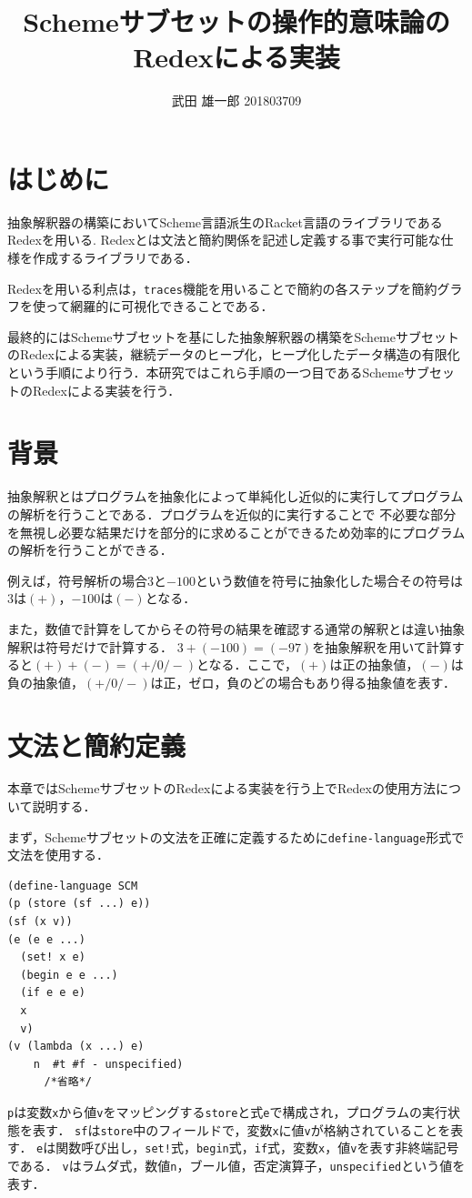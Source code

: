 \documentclass[twocolumn]{jsarticle}
\title{\textbf{Schemeサブセットの操作的意味論のRedexによる実装}}
\author{武田 雄一郎 201803709}
\date{} %
\begin{document}
\maketitle
\thispagestyle{fancy}

\section{はじめに}


抽象解釈器の構築においてScheme言語派生のRacket言語のライブラリであるRedexを用いる.
Redexとは文法と簡約関係を記述し定義する事で実行可能な仕様を作成するライブラリである．

Redexを用いる利点は，\verb|traces|機能を用いることで簡約の各ステップを簡約グラフを使って網羅的に可視化できることである．

最終的にはSchemeサブセット\cite{3}を基にした抽象解釈器の構築をSchemeサブセットのRedexによる実装，継続データのヒープ化\cite{4}，ヒープ化したデータ構造の有限化\cite{5}という手順により行う．本研究ではこれら手順の一つ目であるSchemeサブセットのRedexによる実装を行う．
\section{背景}
抽象解釈とはプログラムを抽象化によって単純化し近似的に実行してプログラムの解析を行うことである．プログラムを近似的に実行することで
不必要な部分を無視し必要な結果だけを部分的に求めることができるため効率的にプログラムの解析を行うことができる．

例えば，符号解析の場合$3$と$-100$という数値を符号に抽象化した場合その符号は$3$は$(+)$，$-100$は$(-)$となる．

また，数値で計算をしてからその符号の結果を確認する通常の解釈とは違い抽象解釈は符号だけで計算する．
$3+(-100)=(-97)$を抽象解釈を用いて計算すると$(+)+(-)=(+/0/-)$となる．ここで，$(+)$は正の抽象値，$(-)$は負の抽象値，$(+/0/-)$は正，ゼロ，負のどの場合もあり得る抽象値を表す．
\section{文法と簡約定義}
本章ではSchemeサブセット\cite{3}のRedexによる実装を行う上でRedexの使用方法について説明する．

まず，Schemeサブセットの文法を正確に定義するために\verb|define-language|形式で文法を使用する．
\begin{verbatim}
(define-language SCM
(p (store (sf ...) e))
(sf (x v))
(e (e e ...)
  (set! x e) 
  (begin e e ...)
  (if e e e) 
  x
  v)
(v (lambda (x ...) e)
    n  #t #f - unspecified)
    　/*省略*/
\end{verbatim}  
\verb|p|は変数\verb|x|から値\verb|v|をマッピングする\verb|store|と式\verb|e|で構成され，プログラムの実行状態を表す．
\verb|sf|は\verb|store|中のフィールドで，変数\verb|x|に値\verb|v|が格納されていることを表す．
\verb|e|は関数呼び出し，\verb|set!|式，\verb|begin|式，\verb|if|式，変数\verb|x|，値\verb|v|を表す非終端記号である．
\verb|v|はラムダ式，数値\verb|n|，ブール値，否定演算子，\verb|unspecified|という値を表す．
\end{document}
